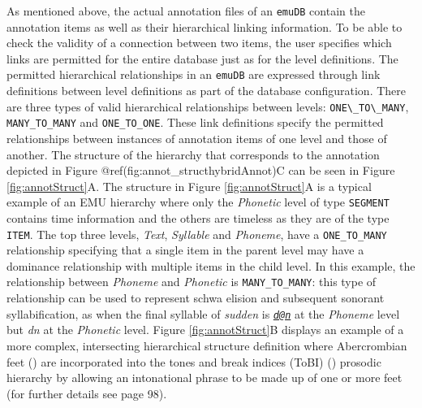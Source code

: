 \documentclass[]{book}
\theoremstyle{definition}
\theoremstyle{definition}
\theoremstyle{definition}
\theoremstyle{remark}
\begin{document}
As mentioned above, the actual annotation files of an \texttt{emuDB}
contain the annotation items as well as their hierarchical linking
information. To be able to check the validity of a connection between
two items, the user specifies which links are permitted for the entire
database just as for the level definitions. The permitted hierarchical
relationships in an \texttt{emuDB} are expressed through link
definitions between level definitions as part of the database
configuration. There are three types of valid hierarchical relationships
between levels: \texttt{ONE\textbackslash{}\_TO\textbackslash{}\_MANY},
\texttt{MANY\_TO\_MANY} and \texttt{ONE\_TO\_ONE}. These link
definitions specify the permitted relationships between instances of
annotation items of one level and those of another. The structure of the
hierarchy that corresponds to the annotation depicted in Figure
@ref(fig:annot\_structhybridAnnot)C can be seen in Figure
\ref{fig:annotStruct}A. The structure in Figure \ref{fig:annotStruct}A
is a typical example of an EMU hierarchy where only the
\textit{Phonetic} level of type \texttt{SEGMENT} contains time
information and the others are timeless as they are of the type
\texttt{ITEM}. The top three levels, \emph{Text}, \emph{Syllable} and
\emph{Phoneme}, have a \texttt{ONE\_TO\_MANY} relationship specifying
that a single item in the parent level may have a dominance relationship
with multiple items in the child level. In this example, the
relationship between \textit{Phoneme} and \emph{Phonetic} is
\texttt{MANY\_TO\_MANY}: this type of relationship can be used to
represent schwa elision and subsequent sonorant syllabification, as when
the final syllable of \emph{sudden} is
\emph{\href{mailto:d@n}{\nolinkurl{d@n}}} at the \emph{Phoneme} level
but \emph{dn} at the \emph{Phonetic} level. Figure
\ref{fig:annotStruct}B displays an example of a more complex,
intersecting hierarchical structure definition where Abercrombian feet
(\citet{abercombie:1967a}) are incorporated into the tones and break
indices (ToBI) (\citet{beckman:1997aa}) prosodic hierarchy by allowing
an intonational phrase to be made up of one or more feet (for further
details see \citet{harrington:2010a} page 98).
\end{document}

